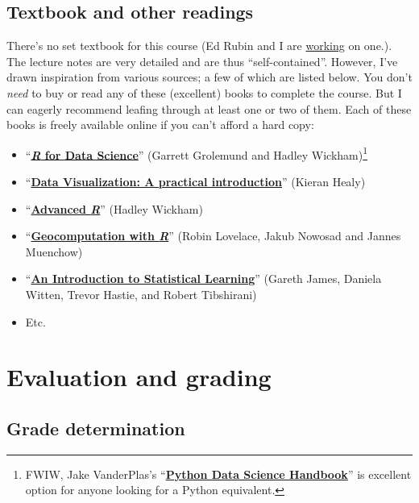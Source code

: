 \documentclass[12]{article}
\begin{document}
\subsection*{Textbook and other readings}

There's no set textbook for this course (Ed Rubin and I are
\href{https://grantmcdermott.com/ds4e}{working} on one.). The lecture notes are
very detailed and are thus ``self-contained''. However, I've drawn inspiration
from various sources; a few of which are listed below. You don't \textit{need}
to buy or read any of these (excellent) books to complete the course. But I can
eagerly recommend leafing through at least one or two of them. Each of these
books is freely available online if you can't afford a hard copy:
%
\begin{itemize}
	\item ``\href{http://r4ds.had.co.nz}{\textbf{\textit{R} for Data Science}}'' (Garrett Grolemund and Hadley Wickham)\footnote{FWIW, Jake VanderPlas's ``\href{https://jakevdp.github.io/PythonDataScienceHandbook/}{\textbf{Python Data Science Handbook}}'' is excellent option for anyone looking for a Python equivalent.}
	\item ``\href{http://socviz.co/}{\textbf{Data Visualization: A practical introduction}}'' (Kieran Healy)
    \item ``\href{https://adv-r.hadley.nz/}{\textbf{Advanced \textit{R}}}'' (Hadley Wickham)
    \item ``\href{https://geocompr.robinlovelace.net/}{\textbf{Geocomputation with \textit{R}}}'' (Robin Lovelace, Jakub Nowosad and Jannes Muenchow)
    \item ``\href{https://statlearning.com}{\textbf{An Introduction to Statistical Learning}}'' (Gareth James, Daniela Witten, Trevor Hastie, and Robert Tibshirani)
    \item Etc.
\end{itemize}

\section*{Evaluation and grading}

\subsection*{Grade determination}
\end{document}
